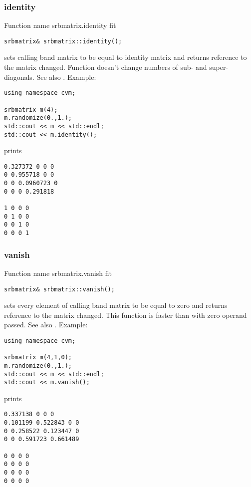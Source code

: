 \subsubsection{identity}
Function%
\pdfdest name {srbmatrix.identity} fit
\begin{verbatim}
srbmatrix& srbmatrix::identity();
\end{verbatim}
sets  calling band matrix to be equal to identity matrix
and returns  reference to
the matrix changed. 
Function doesn't change
numbers of sub- and super-diagonals.
See also .
Example:
\begin{Verbatim}
using namespace cvm;

srbmatrix m(4);
m.randomize(0.,1.);
std::cout << m << std::endl;
std::cout << m.identity();
\end{Verbatim}
prints
\begin{Verbatim}
0.327372 0 0 0
0 0.955718 0 0
0 0 0.0960723 0
0 0 0 0.291818

1 0 0 0
0 1 0 0
0 0 1 0
0 0 0 1
\end{Verbatim}
\newpage





\subsubsection{vanish}
Function%
\pdfdest name {srbmatrix.vanish} fit
\begin{verbatim}
srbmatrix& srbmatrix::vanish();
\end{verbatim}
sets every element of  calling band matrix to be equal to zero
and returns  reference to
the matrix changed. This function is faster
than
with zero operand passed.
See also .
Example:
\begin{Verbatim}
using namespace cvm;

srbmatrix m(4,1,0);
m.randomize(0.,1.);
std::cout << m << std::endl;
std::cout << m.vanish();
\end{Verbatim}
prints
\begin{Verbatim}
0.337138 0 0 0
0.101199 0.522843 0 0
0 0.258522 0.123447 0
0 0 0.591723 0.661489

0 0 0 0
0 0 0 0
0 0 0 0
0 0 0 0
\end{Verbatim}
\newpage




